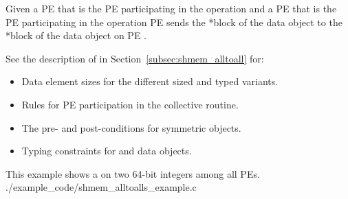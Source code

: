 \begin{apidefinition}
{    Given a \ac{PE}  that is the \kth \ac{PE}
    participating in the operation and a \ac{PE}
     that is the \lth \ac{PE}
    participating in the operation
    \ac{PE}  sends the *\lth block of the  data object to
    the *\kth block of the  data object on
    \ac{PE} .

    See the description of  in
    Section~\ref{subsec:shmem_alltoall} for:
    \begin{itemize}
    \item Data element sizes for the different sized and typed  variants.
    \item Rules for \ac{PE} participation in the collective routine.
    \item The pre- and post-conditions for symmetric objects.
    \item Typing constraints for \dest{} and \source{} data objects.
    \end{itemize}
    
} 




\begin{apiexamples}

\apicexample
    {This \CorCpp{} example shows a  on two 64-bit integers among
    all \acp{PE}.}
    {./example_code/shmem_alltoalls_example.c}
    {}

\end{apiexamples}

\end{apidefinition}
